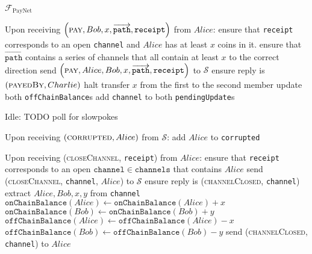 \begin{functionality}{$\mathcal{F}_{\mathrm{PayNet}}$}
\begin{algorithmic}[1]
    \State Upon receiving $\left(\textsc{pay}, Bob, x,
    \overrightarrow{\mathtt{path}}, \mathtt{receipt}\right)$ from $Alice$:
    \Indent
      \State ensure that \texttt{receipt} corresponds to an open
      \texttt{channel} and $Alice$ has at least $x$ coins in it.
      \State ensure that $\overrightarrow{\mathtt{path}}$ contains a series of
      channels that all contain at least $x$ to the correct direction
      \State send $\left(\textsc{pay}, Alice, Bob, x,
      \overrightarrow{\mathtt{path}}, \mathtt{receipt}\right)$ to $\mathcal{S}$
      \State ensure reply is $\left(\textsc{payedBy}, Charlie\right)$
          \EndIndent
        \EndIndent
        \State halt
      \Else
          \State transfer $x$ from the first to the second member
          \State update both \texttt{offChainBalance}s
          \State add \texttt{channel} to both \texttt{pendingUpdate}s
        \EndFor
      \EndIf
    \EndIndent
    \State

    \State Idle: TODO poll for slowpokes
    \State

    \State Upon receiving $\left(\textsc{corrupted}, Alice\right)$ from
    $\mathcal{S}$:
    \Indent
      \State add $Alice$ to \texttt{corrupted}
    \EndIndent

    \State Upon receiving (\textsc{closeChannel}, \texttt{receipt}) from $Alice$:
    \Indent
      \State ensure that \texttt{receipt} corresponds to an open
      $\mathtt{channel} \in \mathtt{channels}$ that contains $Alice$
      \State send (\textsc{closeChannel}, \texttt{channel}, $Alice$) to
      $\mathcal{S}$
      \State ensure reply is (\textsc{channelClosed}, \texttt{channel})
      \State extract $Alice, Bob, x, y$ from \texttt{channel}
      \State $\mathtt{onChainBalance}\left(Alice\right) \gets
      \mathtt{onChainBalance}\left(Alice\right) + x$
      \State $\mathtt{onChainBalance}\left(Bob\right) \gets
      \mathtt{onChainBalance}\left(Bob\right) + y$
      \State $\mathtt{offChainBalance}\left(Alice\right) \gets
      \mathtt{offChainBalance}\left(Alice\right) - x$
      \State $\mathtt{offChainBalance}\left(Bob\right) \gets
      \mathtt{offChainBalance}\left(Bob\right) - y$
      \State send (\textsc{channelClosed}, \texttt{channel}) to $Alice$
    \EndIndent
  \end{algorithmic}
\end{functionality}
